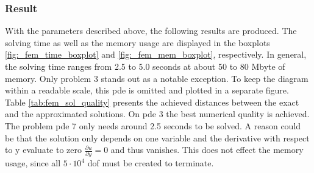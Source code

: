 \documentclass[./\jobname.tex]{subfiles}
\begin{document}
\subsubsection{Result}
With the parameters described above, the following results are produced. The solving time as well as the memory usage are displayed in the boxplots \ref{fig:_fem_time_boxplot} and \ref{fig:_fem_mem_boxplot}, respectively. In general, the solving time ranges from 2.5 to 5.0 seconds at about 50 to 80 Mbyte of memory. Only problem 3 stands out as a notable exception. To keep the diagram within a readable scale, this \gls{pde} is omitted and plotted in a separate figure. Table \ref{tab:fem_sol_quality} presents the achieved distances between the exact and the approximated solutions. On \gls{pde} 3 the best numerical quality is achieved. The problem \gls{pde} 7 only needs around 2.5 seconds to be solved. A reason could be that the solution only depends on one variable and the derivative with respect to y evaluate to zero $\frac{\partial u}{\partial y} = 0$ and thus vanishes. This does not effect the memory usage, since all $5 \cdot 10^4$ \gls{dof} must be created to terminate. 
\end{document}

